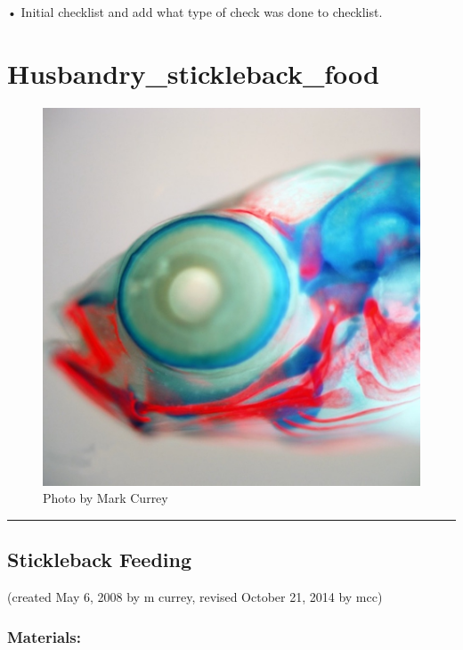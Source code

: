 \documentclass[
]{book}
\begin{document}
• Initial checklist and add what type of check was done to checklist.

\hypertarget{husbandry_stickleback_food}{%
\chapter{Husbandry\_stickleback\_food}\label{husbandry_stickleback_food}}

\begin{figure}
\centering
\includegraphics{images/double_head.jpg}
\caption{Photo by Mark Currey}
\end{figure}

\begin{center}\rule{0.5\linewidth}{0.5pt}\end{center}

\hypertarget{stickleback-feeding}{%
\section{Stickleback Feeding}\label{stickleback-feeding}}

(created May 6, 2008 by m currey, revised October 21, 2014 by mcc)

\hypertarget{materials}{%
\subsection{Materials:}\label{materials}}
\end{document}
